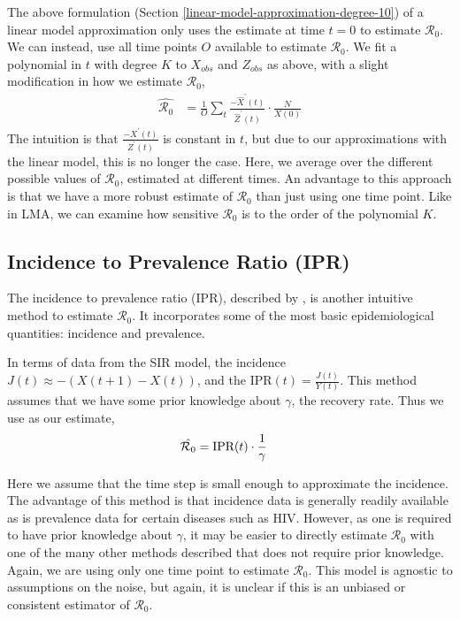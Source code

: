 \documentclass[12pt]{article}
\newcommand{\rr}{\ensuremath{\mathcal{R}_0}}
\begin{document}
The above formulation (Section \ref{linear-model-approximation-degree-10}) of a linear model approximation only uses the estimate at time $t=0$ to estimate $\rr$.  We can instead, use all time points $O$ available to estimate $\rr$.  We fit a polynomial in \(t\) with degree \(K\) to \(X_{obs}\)
and \(Z_{obs}\) as above, with a slight modification in how we estimate
\(\rr\),
\begin{align*}
  \hat{\rr} &= \frac{1}{O} \sum_t \frac{-\hat{X}^\prime(t)}{\hat{Z}^\prime(t)} \cdot \frac{N}{X(0)} 
\end{align*}
The intuition is that $\frac{-X^\prime(t)}{Z^\prime(t)}$ is constant in $t$, but due to our approximations with the linear model, this is no longer the case.  Here, we average over the different possible values of $\rr$, estimated at different times.  An advantage to this approach is that we have a more robust estimate of $\rr$ than just using one time point.  Like in LMA, we can examine how sensitive $\rr$ is to the order of the polynomial $K$.


\subsection{Incidence to Prevalence Ratio (IPR)}\label{incidence-to-prevalence-ratio}
The incidence to prevalence ratio (IPR), described by \cite{Nishiura2009}, is another intuitive method to estimate $\rr$.  It incorporates some of the most basic epidemiological quantities: incidence and prevalence.

In terms of data from the SIR model, the incidence $J(t) \approx -(X(t+1) - X(t))$, and the IPR$(t) = \frac{J(t)}{Y(t)}$.  This method assumes that we have some prior knowledge about $\gamma$, the recovery rate.  Thus we use as our estimate,
\begin{align*}
\hat{\rr} &= \textnormal{IPR}(t) \cdot \frac{1}{\gamma}
\end{align*}

Here we assume that the time step is small enough to approximate the incidence.  The advantage of this method is that incidence data is generally readily available as is prevalence data for certain diseases such as HIV.  However, as one is required to have prior knowledge about $\gamma$, it may be easier to directly estimate $\rr$ with one of the many other methods described that does not require  prior knowledge.  Again, we are using only one time point to estimate $\rr$.  This model is agnostic to assumptions on the noise, but again, it is unclear if this is an unbiased or consistent estimator of $\rr$.
\end{document}
